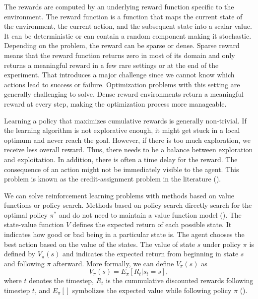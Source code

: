 The rewards are computed by an underlying reward function specific to the environment. The reward function is a function that maps the current state of the environment, the current action, and the subsequent state into a scalar value. It can be deterministic or can contain a random component making it stochastic. Depending on the problem, the reward can be sparse or dense. Sparse reward means that the reward function returns zero in most of its domain and only returns a meaningful reward in a few rare settings or at the end of the experiment. That introduces a major challenge since we cannot know which actions lead to success or failure. Optimization problems with this setting are generally challenging to solve. Dense reward environments return a meaningful reward at every step, making the optimization process more manageable.

Learning a policy that maximizes cumulative rewards is generally non-trivial. If the learning algorithm is not explorative enough, it might get stuck in a local optimum and never reach the goal. However, if there is too much exploration, we receive less overall reward. Thus, there needs to be a balance between exploration and exploitation. In addition, there is often a time delay for the reward. The consequence of an action might not be immediately visible to the agent. This problem is known as the credit-assignment problem in the literature (\cite{sutton2018reinforcement}).

We can solve reinforcement learning problems with methods based on value functions or policy search. Methods based on policy search directly search for the optimal policy $\pi^*$ and do not need to maintain a value function model (\cite{8103164}). The state-value function $V$ defines the expected return of each possible state. It indicates how good or bad being in a particular state is. The agent chooses the best action based on the value of the states. The value of state $s$ under policy $\pi$ is defined by $V_\pi(s)$ and indicates the expected return from beginning in state $s$ and following $\pi$ afterward. More formally, we can define $V_\pi(s)$ as
\begin{equation*}
  V_\pi(s) = E_\pi [R_t | s_t = s],
\end{equation*}
where $t$ denotes the timestep, $R_t$ is the cummulative discounted rewards following timestep $t$, and $E_\pi[]$ symbolizes the expected value while following policy $\pi$ (\cite{sutton2018reinforcement}).

